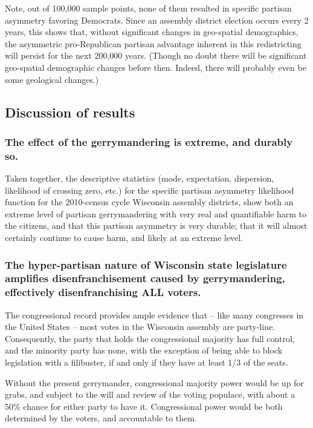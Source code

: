 \documentclass[preprint,12pt]{article}
\begin{document}
Note, out of 100,000 sample points, none of them resulted in specific partisan asymmetry favoring Democrats.  Since an assembly district election occurs every 2 years, this shows that, without significant changes in geo-spatial demographics, the asymmetric pro-Republican partisan advantage inherent in this redistricting will persist for the next 200,000 years.  (Though no doubt there will be significant geo-spatial demographic changes before then.  Indeed, there will probably even be some geological changes.)

\subsection{Discussion of results}
\subsubsection{The effect of the gerrymandering is extreme, and durably so.}
 
Taken together, the descriptive statistics (mode, expectation, dispersion, likelihood of crossing zero, etc.) for the specific partisan asymmetry likelihood function for the 2010-census cycle Wisconsin assembly districts, show both an extreme level of partisan gerrymandering with very real and quantifiable harm to the citizens, and that this partisan asymmetry is very durable; that it will almost certainly continue to cause harm, and likely at an extreme level.
 
\subsubsection{The hyper-partisan nature of Wisconsin state legislature amplifies disenfranchisement caused by gerrymandering, effectively disenfranchising ALL voters.}
 
The congressional record provides ample evidence that -- like many congresses in the United States -- most votes in the Wisconsin assembly are party-line.  Consequently, the party that holds the congressional majority has full control, and the minority party has none, with the exception of being able to block legislation with a filibuster, if and only if they have at least 1/3 of the seats.
 
Without the present gerrymander, congressional majority power would be up for grabs, and subject to the will and review of the voting populace, with about a 50\% chance for either party to have it.  Congressional power would be both determined by the voters, and accountable to them.
 
\end{document}

